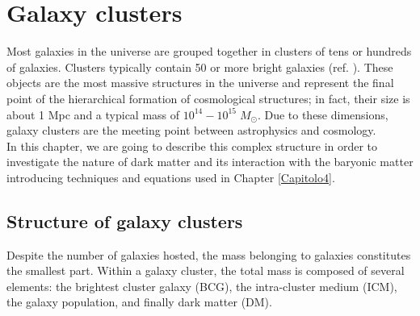 \chapter{Galaxy clusters} \label{capitolo 3}

Most galaxies in the universe are grouped together in clusters of tens or hundreds of galaxies. Clusters typically contain 50 or more bright galaxies (ref. \cite{Galaxy-Formation-and-Evolution}).
These objects are the most massive structures in the universe and represent the final point of the hierarchical formation of cosmological structures; in fact, their size is about 1 Mpc and a typical mass of $10^{14} - 10^{15} \; M_\odot$. Due to these dimensions, galaxy clusters are the meeting point between astrophysics and cosmology.\\ 
In this chapter, we are going to describe this complex structure in order to investigate the nature of dark matter and its interaction with the baryonic matter introducing techniques and equations used in Chapter \ref{Capitolo4}.

\section{Structure of galaxy clusters}
Despite the number of galaxies hosted, the mass belonging to galaxies constitutes the smallest part. Within a galaxy cluster, the total mass is composed of several elements: the brightest cluster galaxy (BCG), the intra-cluster medium (ICM), the galaxy population, and finally dark matter (DM).

